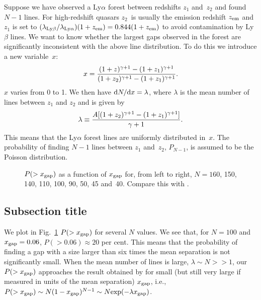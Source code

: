 \documentclass[useAMS,usenatbib]{mn2e}
\begin{document}
Suppose we have observed a Ly$\alpha$ forest between redshifts $z_1$
and~$z_2$ and found $N-1$ lines.  For high-redshift quasars $z_2$~is
usually the emission redshift $z_{{\mathrm{em}}}$ and $z_1$ is set to
$(\lambda_{{\mathrm{Ly}}\beta}/\lambda_{{\mathrm{Ly}}\alpha})(1+z_{{\mathrm{em}}})=0.844
(1+z_{{\mathrm{em}}})$ to avoid contamination by Ly$\beta$ lines.  We
want to know whether the largest gaps observed in the forest are
significantly inconsistent with the above line distribution.  To do
this we introduce a new variable~$x$:
%
\begin{equation}
x={(1+z)^{\gamma+1}-(1+z_1)^{\gamma+1} \over
     (1+z_2)^{\gamma+1}-(1+z_1)^{\gamma+1}}.
\end{equation}
%
$x$ varies from 0 to 1.  We then have ${\mathrm{d}}N/{\mathrm{d}}x=\lambda$, where $\lambda$
is the mean number of lines between $z_1$ and $z_2$ and is given by
%
\begin{equation}
\lambda\equiv{A[(1+z_2)^{\gamma+1}-(1+z_1)^{\gamma+1}]\over\gamma+1}.
\end{equation}
%
This means that the Ly$\alpha$ forest lines are uniformly
distributed in~$x$. The probability of finding $N-1$ lines between $z_1$
and~$z_2$, $P_{N-1}$, is assumed to be the Poisson distribution.
%
\newpage
%
\begin{figure}
\vspace{11pc}
\caption{$P(>x_{{\mathrm{gap}}})$ as a function of $x_{{\mathrm{gap}}}$ for,
 from left to right, $N=160$, 150, 140, 110, 100, 90, 50, 45 and~40.
 Compare this with \protect\citet{b15}.}
\label{appenfig}
\end{figure}

\subsection{Subsection title}

We plot in Fig.~\ref{appenfig} $P(>x_{{\mathrm{gap}}})$ for several $N$
values. We see that, for $N=100$ and $x_{{\mathrm{gap}}}=0.06$,
$P(>0.06)\approx20$ per cent.  This means that the probability of
finding a gap with a size larger than six times the mean
separation is not significantly small. When the mean number of
lines is large, $\lambda\sim N>>1$, our $P(>x_{{\mathrm{gap}}})$
approaches the result obtained by \citet[fig. 4]{b22} for small
(but still very large if measured in units of the mean separation)
$x_{{\mathrm{gap}}}$, i.e., $P(>x_{{\mathrm{gap}}})\sim N(1-
x_{{\mathrm{gap}}})^{N-1}\sim N {{\mathrm{exp}}}(-\lambda x_{{\mathrm{gap}}})$.

\bsp

\label{lastpage}
\end{document}

